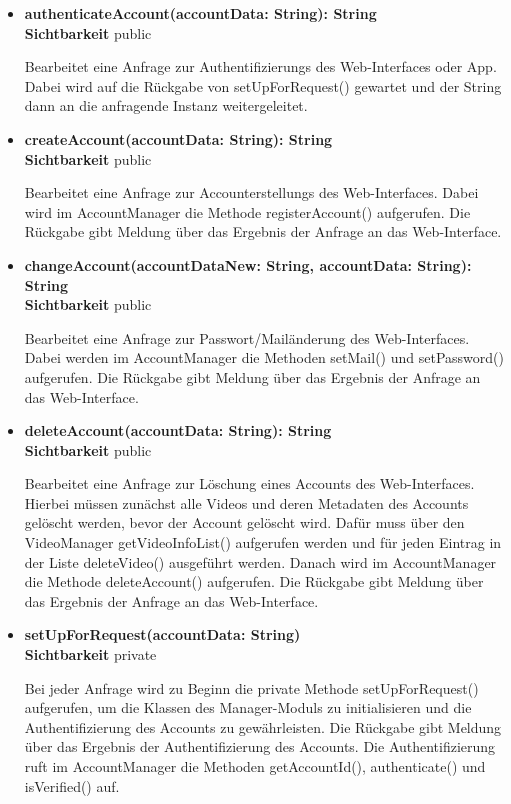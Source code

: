 \begin{itemize}
\item \textbf{authenticateAccount(accountData: String): String}\hfill\\
\textbf{Sichtbarkeit} public

Bearbeitet eine Anfrage zur Authentifizierungs des Web-Interfaces oder App. Dabei wird auf die Rückgabe von setUpForRequest() gewartet und der String dann an die anfragende Instanz weitergeleitet.

\item \textbf{createAccount(accountData: String): String}\hfill\\
\textbf{Sichtbarkeit} public

Bearbeitet eine Anfrage zur Accounterstellungs des Web-Interfaces. Dabei wird im AccountManager die Methode registerAccount() aufgerufen. Die Rückgabe gibt Meldung über das Ergebnis der Anfrage an das Web-Interface.

\item \textbf{changeAccount(accountDataNew: String, accountData: String): String}\hfill\\
\textbf{Sichtbarkeit} public

Bearbeitet eine Anfrage zur Passwort/Mailänderung des Web-Interfaces. Dabei werden im AccountManager die Methoden setMail() und setPassword()  aufgerufen. Die Rückgabe gibt Meldung über das Ergebnis der Anfrage an das Web-Interface.

\item \textbf{deleteAccount(accountData: String): String}\hfill\\
\textbf{Sichtbarkeit} public

Bearbeitet eine Anfrage zur Löschung eines Accounts des Web-Interfaces. Hierbei müssen zunächst alle Videos und deren Metadaten des Accounts gelöscht werden, bevor der Account gelöscht wird. Dafür muss über den VideoManager getVideoInfoList() aufgerufen werden und für jeden Eintrag in der Liste deleteVideo() ausgeführt werden. Danach wird im AccountManager die Methode deleteAccount() aufgerufen. Die Rückgabe gibt Meldung über das Ergebnis der Anfrage an das Web-Interface.

\item \textbf{setUpForRequest(accountData: String)}\hfill\\
\textbf{Sichtbarkeit} private

Bei jeder Anfrage wird zu Beginn die private Methode setUpForRequest() aufgerufen, um die Klassen des Manager-Moduls zu initialisieren und die Authentifizierung des Accounts zu gewährleisten. Die Rückgabe gibt Meldung über das Ergebnis der Authentifizierung des Accounts. Die Authentifizierung ruft im AccountManager die Methoden getAccountId(), authenticate() und isVerified() auf.
\end{itemize}